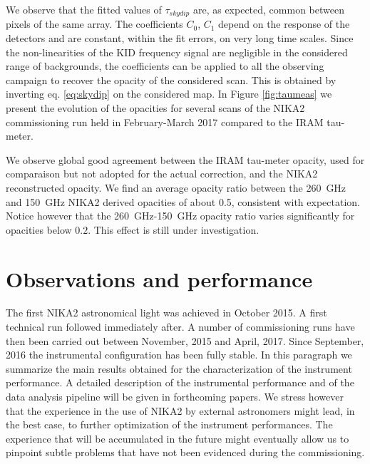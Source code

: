 \documentclass[]{aa} %
\begin{document}
We observe that the fitted values of $\tau_{skydip}$ are, as expected, common between pixels of the same array. The coefficients  $C_0$, $C_1$ depend on the response of the detectors and are constant, within the fit errors, on very long time scales. Since the non-linearities of the KID frequency signal are negligible in the considered range of backgrounds, the coefficients can be applied to all the observing campaign to recover the opacity of the considered scan. This is obtained by inverting eq. \ref{eq:skydip} on the considered map. In Figure \ref{fig:taumeas} we present the evolution of the opacities for several scans of the NIKA2 commissioning run held in February-March 2017 compared to the IRAM tau-meter.

We observe global good agreement between the IRAM tau-meter opacity, used for comparaison but not adopted for the actual correction, and the NIKA2 reconstructed opacity. We find an average opacity ratio between the 260~GHz and 150~GHz NIKA2 derived opacities of about 0.5, consistent with expectation. Notice however that the 260~GHz-150~GHz opacity ratio varies significantly for opacities below $0.2$. This effect is still under investigation. 


\section{Observations and performance}
\label{Observations and performance}

The first NIKA2 astronomical light was achieved in October 2015. A first technical run followed immediately after. A number of commissioning runs have then been carried out between November, 2015 and April, 2017. Since September, 2016 the instrumental configuration has been fully stable. 
In this paragraph we summarize the main results obtained for the characterization of the instrument performance. A detailed description of the instrumental performance and of the data analysis pipeline will be given in forthcoming papers. We stress however that the experience in the use of NIKA2 by external astronomers might lead, in the best case, to further optimization of the instrument performances. The experience that will be accumulated in the future might eventually allow us to pinpoint subtle problems that have not been evidenced during the commissioning. 
\end{document}

